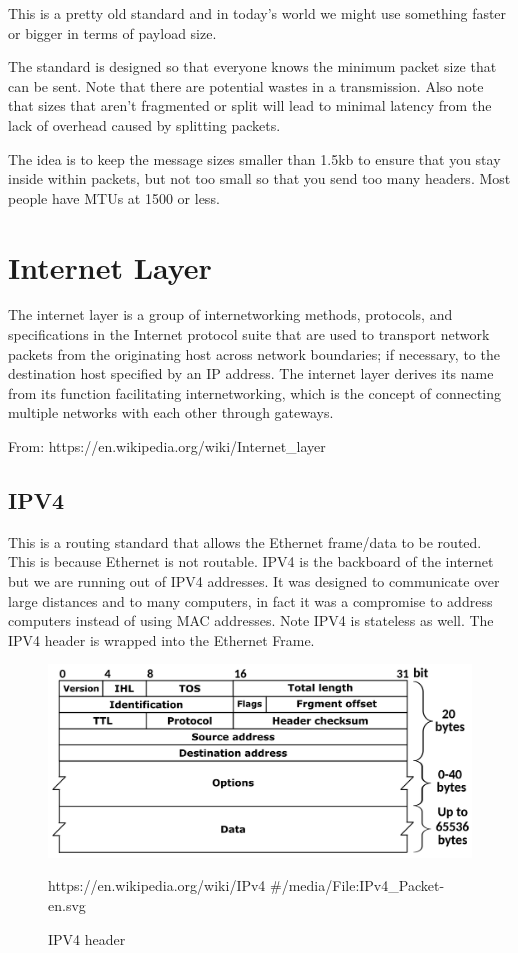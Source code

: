 \documentclass[../CMPUT-404-Notes.tex]{subfiles}
\begin{document}
\begin{Note}
  This is a pretty old standard and in today's world we might use something faster or bigger in terms of payload size.  
\end{Note}

The standard is designed so that everyone knows the minimum packet size that can be sent. 
Note that there are potential wastes in a transmission.
Also note that sizes that aren't fragmented or split will lead to minimal latency from the lack of overhead caused by splitting packets.

The idea is to keep the message sizes smaller than 1.5kb to ensure that you stay inside within packets, but not too small so that you send too many headers. Most people have MTUs at 1500 or less.


\section{Internet Layer}
\begin{quotebox}
  The internet layer is a group of internetworking methods, protocols, and specifications in the Internet protocol suite that are used to transport network packets from the originating host across network boundaries; if necessary, to the destination host specified by an IP address. The internet layer derives its name from its function facilitating internetworking, which is the concept of connecting multiple networks with each other through gateways.

  From: https://en.wikipedia.org/wiki/Internet\_layer
\end{quotebox}
\subsection{IPV4}
This is a routing standard that allows the Ethernet frame/data to be routed. This is because Ethernet is not routable. 
IPV4 is the backboard of the internet but we are running out of IPV4 addresses. 
It was designed to communicate over large distances and to many computers, in fact it was a compromise to address computers instead of using MAC addresses. 
Note IPV4 is stateless as well.
The IPV4 header is wrapped into the Ethernet Frame.

\begin{figure}[!h]
  \centering
  \includegraphics[width=\columnwidth]{../assets/IPv4-Packet-en.png}
  \caption{IPV4 header}
  \label{fig:-assets-IPv4-Packet-en-svg-png}
  https://en.wikipedia.org/wiki/IPv4 \#/media/File:IPv4\_Packet-en.svg
\end{figure}
\end{document}
